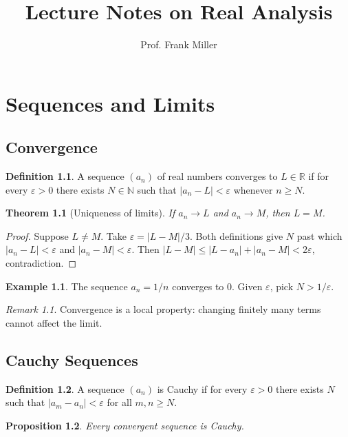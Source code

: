\documentclass{book}
\title{Lecture Notes on Real Analysis}
\author{Prof. Frank Miller}
\newtheorem{theorem}{Theorem}[section]
\newtheorem{proposition}[theorem]{Proposition}
\theoremstyle{definition}
\newtheorem{definition}{Definition}[section]
\newtheorem{example}{Example}[section]
\theoremstyle{remark}
\newtheorem*{remark}{Remark}
\begin{document}
\maketitle
\tableofcontents

\chapter{Sequences and Limits}

\section{Convergence}

\begin{definition}
A sequence $(a_n)$ of real numbers converges to $L \in \mathbb{R}$ if for every $\varepsilon > 0$ there exists $N \in \mathbb{N}$ such that $|a_n - L| < \varepsilon$ whenever $n \geq N$.
\end{definition}

\begin{theorem}[Uniqueness of limits]
If $a_n \to L$ and $a_n \to M$, then $L = M$.
\end{theorem}

\begin{proof}
Suppose $L \neq M$. Take $\varepsilon = |L - M|/3$. Both definitions give $N$ past which $|a_n - L| < \varepsilon$ and $|a_n - M| < \varepsilon$. Then $|L - M| \leq |L - a_n| + |a_n - M| < 2\varepsilon$, contradiction.
\end{proof}

\begin{example}
The sequence $a_n = 1/n$ converges to $0$. Given $\varepsilon$, pick $N > 1/\varepsilon$.
\end{example}

\begin{remark}
Convergence is a local property: changing finitely many terms cannot affect the limit.
\end{remark}

\section{Cauchy Sequences}

\begin{definition}
A sequence $(a_n)$ is Cauchy if for every $\varepsilon > 0$ there exists $N$ such that $|a_m - a_n| < \varepsilon$ for all $m, n \geq N$.
\end{definition}

\begin{proposition}
Every convergent sequence is Cauchy.
\end{proposition}
\end{document}
